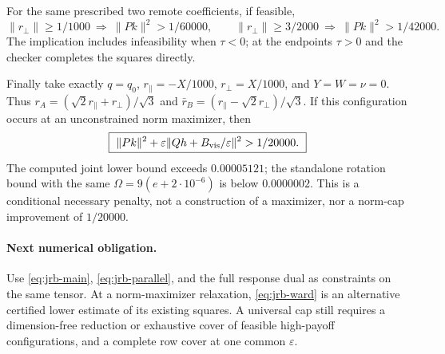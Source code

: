 For the same prescribed two remote coefficients, if feasible,
\[
 \|r_\perp\|\ge1/1000\ \Longrightarrow\ \|Pk\|^2>1/60000,
 \qquad
 \|r_\perp\|\ge3/2000\ \Longrightarrow\ \|Pk\|^2>1/42000.
\]
The implication includes infeasibility when $\tau<0$; at the endpoints
$\tau>0$ and the checker completes the squares directly.

Finally take exactly $q=q_0$, $r_\parallel=-X/1000$,
$r_\perp=X/1000$, and $Y=W=\nu=0$. Thus
$r_A=(\sqrt2r_\parallel+r_\perp)/\sqrt3$ and
$\bar r_B=(r_\parallel-\sqrt2r_\perp)/\sqrt3$.
If this configuration occurs at an unconstrained norm maximizer, then
\[
 \boxed{\ \|Pk\|^2+\varepsilon\|Qh+B_{\rm vis}/\varepsilon\|^2
            >1/20000.\ }
\]
The computed joint lower bound exceeds $0.00005121$;
the standalone rotation bound with the same $\Omega=9(e+2\cdot10^{-6})$
is below $0.0000002$. This is a conditional necessary penalty, not a
construction of a maximizer, nor a norm-cap improvement of $1/20000$.

\paragraph{Next numerical obligation.}
Use \eqref{eq:jrb-main}, \eqref{eq:jrb-parallel}, and the full response
dual as constraints on the same tensor. At a norm-maximizer relaxation,
\eqref{eq:jrb-ward} is an alternative certified lower estimate of its
existing squares. A universal cap still requires a dimension-free
reduction or exhaustive cover of feasible high-payoff configurations,
and a complete row cover at one common $\varepsilon$.

